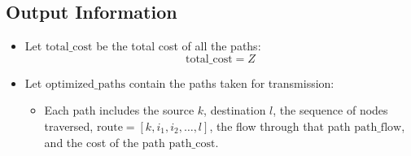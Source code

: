 \documentclass{article}
\begin{document}
\subsection*{Output Information}
\begin{itemize}
    \item Let \( \text{total\_cost} \) be the total cost of all the paths:
    \[
    \text{total\_cost} = Z
    \]
    
    \item Let \( \text{optimized\_paths} \) contain the paths taken for transmission:
    \begin{itemize}
        \item Each path includes the source \( k \), destination \( l \), the sequence of nodes traversed, \( \text{route} = [k, i_1, i_2, \ldots, l] \), the flow through that path \( \text{path\_flow} \), and the cost of the path \( \text{path\_cost} \).
    \end{itemize}
\end{itemize}
\end{document}
